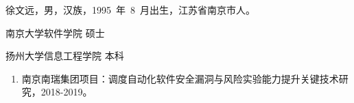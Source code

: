 \documentclass[oneside, master, review]{NJUthesis}
\theoremstyle{plain}
\begin{document}
\tableofcontents
{}


\renewcommand*{\listtablename}{表~~目~~录}
\listoftables
{}
\renewcommand*{\listtablename}{图~~目~~录}
\listoffigures
{}

%

\mainmatter














\makeatletter
\ifNJUT@review%
\else%

\vspace{1ex}
\noindent 徐文远，男，汉族，1995~年~8~月出生，江苏省南京市人。
\vspace{2ex}

\begin{description}[labelindent=0em, leftmargin=8em, style=sameline]
\item[2018.9～2020.6] 南京大学软件学院 \hfill 硕士
\item[2014.9～2018.6] 扬州大学信息工程学院 \hfill 本科
\end{description}


\begin{enumerate}[label=\arabic*., labelindent=0em, leftmargin=*]
    \item 南京南瑞集团项目：调度自动化软件安全漏洞与风险实验能力提升关键技术研究，2018-2019。
\end{enumerate}
\end{document}
